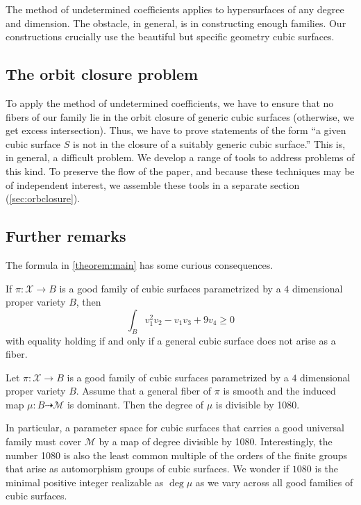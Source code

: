 \documentclass[12pt,reqno]{amsart}
\renewcommand{\to}{{\longrightarrow}}
\numberwithin{equation}{section}
\newcommand{\cX}{\mathcal{X}}
\begin{document}
The method of undetermined coefficients applies to hypersurfaces of
any degree and dimension.  The obstacle, in general, is in
constructing enough families.  Our constructions crucially use the
beautiful but specific geometry cubic surfaces.

\subsection{The orbit closure problem}
To apply the method of undetermined coefficients, we have to ensure that no fibers of our family lie in the orbit closure of generic cubic surfaces (otherwise, we get excess intersection).
Thus, we have to prove statements of the form ``a given cubic surface $S$ is not in the closure of a suitably generic cubic surface.''
This is, in general, a difficult problem.
We develop a range of tools to address problems of this kind.
To preserve the flow of the paper, and because these techniques may be of independent interest, we assemble these tools in a separate section (\autoref{sec:orbclosure}).

\subsection{Further remarks}
The formula in \autoref{theorem:main} has some curious consequences.
\begin{corollary}
  \label{cor:ineq} If $\pi \colon \cX \to B$ is a good family of cubic
  surfaces parametrized by a $4$ dimensional proper variety $B$,
  then
  \[\int_{B} v_{1}^{2}v_{2} - v_{1}v_3 + 9v_{4} \geq 0\]
  with
  equality holding if and only if a general cubic surface does not
  arise as a fiber.
\end{corollary}

\begin{corollary}
  \label{cor:div} Let $\pi \colon \cX \to B$ is a good family of cubic
  surfaces parametrized by a $4$ dimensional proper variety $B$.
  Assume that a general fiber of $\pi$ is smooth and the induced map
  $\mu \colon B \dashrightarrow \mathcal M$ is dominant.
  Then the degree of $\mu$ is divisible by 1080.
\end{corollary}
In particular, a parameter space for cubic surfaces that carries a
good universal family must cover $\mathcal M$ by a map of degree
divisible by 1080.  Interestingly, the number 1080 is also the least
common multiple of the orders of the finite groups that arise as
automorphism groups of cubic surfaces.
We wonder if $1080$ is the minimal positive integer realizable as $\deg \mu$ as we vary
across all good families of cubic surfaces.
\end{document}
